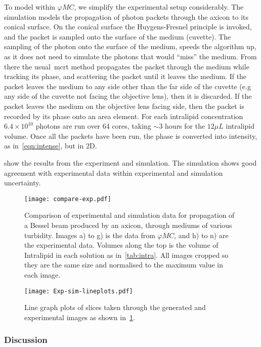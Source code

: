 To model within $\varphi MC$, we simplify the experimental setup considerably.
The simulation models the propagation of photon packets through the axicon to its conical surface. 
On the conical surface the Huygens-Fresnel principle is invoked, and the packet is sampled onto the surface of the medium (cuvette).
The sampling of the photon onto the surface of the medium, speeds the algorithm up, as it does not need to simulate the photons that would ``miss'' the medium.
From there the usual~\gls*{mcrt} method propagates the packet through the medium while tracking its phase, and scattering the packet until it leaves the medium.
If the packet leaves the medium to any side other than the far side of the cuvette (e.g any side of the cuvette not facing the objective lens), then it is discarded.
If the packet leaves the medium on the objective lens facing side, then the packet is recorded by its phase onto an area element.
For each intralipid concentration $6.4\times10^{10}$ photons are run over 64 cores, taking $\sim 3$ hours for the $12\mu L$ intralipid volume.
Once all the packets have been run, the phase is converted into intensity, as in~\cref{eqn:intense}, but in 2D.

 show the results from the experiment and simulation. The simulation shows good agreement with experimental data within experimental and simulation uncertainty.

\begin{figure}[!ht]
\centering
\texttt{[image: compare-exp.pdf]}
\caption{Comparison of experimental and simulation data for propagation of a Bessel beam produced by an axicon, through mediums of various turbidity. Images a) to g) is the data from $\varphi MC$, and h) to n) are the experimental data. Volumes along the top is the volume of Intralipid in each solution as in~\cref{tab:intra}. All images cropped so they are the same size and normalised to the maximum value in each image.}
\label{fig:compareexpbessel}
\end{figure}

\begin{figure}[!htbp]
    \centering
    \texttt{[image: Exp-sim-lineplots.pdf]}
    \caption{Line graph plots of slices taken through the generated and experimental images as shown in~\cref{fig:compareexpbessel}.}
    \label{fig:compareexpbesselLine}
\end{figure}

\subsubsection*{Discussion}

